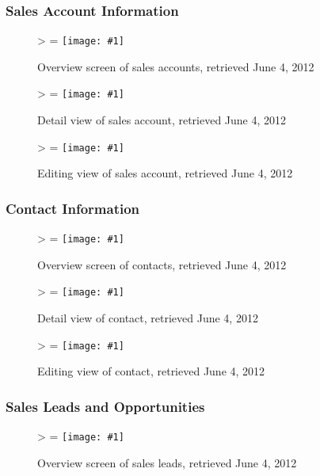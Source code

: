 \documentclass[12pt,letterpaper]{article}
\newlength{\imgwidth}
\newlength{\imgheight}
\newlength{\finalwidth}
\newlength{\finalheight}
\newlength{\imgtextheight}
\newcommand\scalegraphics[1]{%
	\settowidth{\imgwidth}{\texttt{[image: \#1]}}%
	\settoheight{\imgheight}{\texttt{[image: \#1]}}%
	\ifnum\imgwidth>\imgheight \def\imgangle{90} \else \def\imgangle{0} \fi%
	\setlength{\imgtextheight}{0.74\textheight}%
	\setlength{\finalwidth}{\minof{\imgwidth}{\textwidth}}%
	\setlength{\finalheight}{\minof{\imgheight}{\imgtextheight}}%
	\ifnum\finalwidth=\imgwidth \def\imgangle{0} \fi%
	\texttt{[image: \#1]}%
}
\begin{document}
\FloatBarrier
\subsubsection{Sales Account Information}
\begin{figure}[htbp]
	\centering
	\scalegraphics{./img/force/frce_accounts}
	\caption[salesforce.com: Overview screen of sales accounts]{Overview screen of sales accounts, retrieved June 4, 2012}
\end{figure}

\begin{figure}[htbp]
	\centering
	\scalegraphics{./img/force/frce_account_detail}
	\caption[salesforce.com: Detail view of sales account]{Detail view of sales account, retrieved June 4, 2012}
\end{figure}

\begin{figure}[htbp]
	\centering
	\scalegraphics{./img/force/frce_account_edit}
	\caption[salesforce.com: Editing view of sales account]{Editing view of sales account, retrieved June 4, 2012}
\end{figure}

\newpage
\FloatBarrier
\subsubsection{Contact Information}
\begin{figure}[htbp]
	\centering
	\scalegraphics{./img/force/frce_contacts}
	\caption[salesforce.com: Overview screen of contacts]{Overview screen of contacts, retrieved June 4, 2012}
\end{figure}

\begin{figure}[htbp]
	\centering
	\scalegraphics{./img/force/frce_contact_detail}
	\caption[salesforce.com: Detail view of contact]{Detail view of contact, retrieved June 4, 2012}
\end{figure}

\begin{figure}[htbp]
	\centering
	\scalegraphics{./img/force/frce_contact_edit}
	\caption[salesforce.com: Editing view of contact]{Editing view of contact, retrieved June 4, 2012}
\end{figure}

\newpage
\FloatBarrier
\subsubsection{Sales Leads and Opportunities}
\begin{figure}[htbp]
	\centering
	\scalegraphics{./img/force/frce_leads}
	\caption[salesforce.com: Overview screen of sales leads]{Overview screen of sales leads, retrieved June 4, 2012}
\end{figure}
\end{document}
